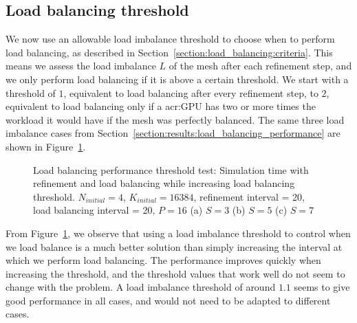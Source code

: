 \subsection{Load balancing threshold}\label{subsection:results:load_balancing_performance:threshold}

We now use an allowable load imbalance threshold to choose when to perform load balancing, as
described in Section~\ref{section:load_balancing:criteria}. This means we assess the load imbalance
\(L\) of the mesh after each refinement step, and we only perform load balancing if it is above a
certain threshold. We start with a threshold of \(1\), equivalent to load balancing after every
refinement step, to \(2\), equivalent to load balancing only if a \acrshort{acr:GPU} has two or more
times the workload it would have if the mesh was perfectly balanced. The same three load imbalance
cases from Section~\ref{section:results:load_balancing_performance} are shown in
Figure~\ref{fig:load_balancing_efficiency_threshold}.

\begin{figure}[H]
    \begin{adjustwidth}{-0.5in}{-0.5in}
        \centering
        \hfill
        \hfill
    \end{adjustwidth}
    \caption{Load balancing performance threshold test: Simulation time with refinement and load balancing while increasing load balancing threshold. \(N_{initial} = 4\), \(K_{initial} = 16384\), refinement interval = 20, load balancing interval = 20, \(P = 16\) (a) \(S = 3\) (b) \(S = 5\) (c) \(S = 7\)}\label{fig:load_balancing_efficiency_threshold}
\end{figure}

From Figure~\ref{fig:load_balancing_efficiency_threshold}, we observe that using a load imbalance
threshold to control when we load balance is a much better solution than simply increasing the
interval at which we perform load balancing. The performance improves quickly when increasing the
threshold, and the threshold values that work well do not seem to change with the problem. A load
imbalance threshold of around \(1.1\) seems to give good performance in all cases, and would not
need to be adapted to different cases.

